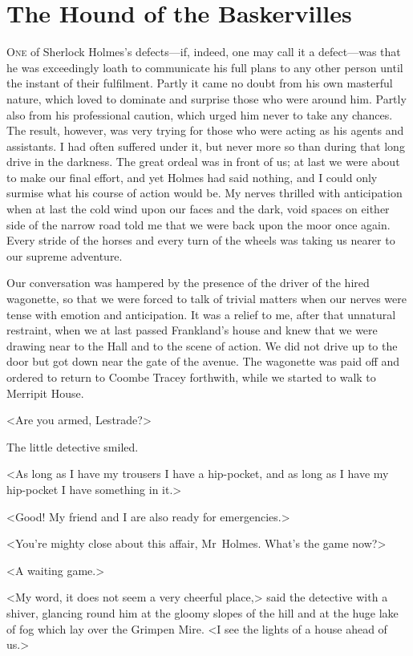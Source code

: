 \chapter{The Hound of the Baskervilles}
\lettrine{O}{ne} of Sherlock Holmes's defects—if, indeed, one may call it a defect—was that he was exceedingly loath to communicate his full plans to any other person until the instant of their fulfilment. Partly it came no doubt from his own masterful nature, which loved to dominate and surprise those who were around him. Partly also from his professional caution, which urged him never to take any chances. The result, however, was very trying for those who were acting as his agents and assistants. I had often suffered under it, but never more so than during that long drive in the darkness. The great ordeal was in front of us; at last we were about to make our final effort, and yet Holmes had said nothing, and I could only surmise what his course of action would be. My nerves thrilled with anticipation when at last the cold wind upon our faces and the dark, void spaces on either side of the narrow road told me that we were back upon the moor once again. Every stride of the horses and every turn of the wheels was taking us nearer to our supreme adventure.

Our conversation was hampered by the presence of the driver of the hired wagonette, so that we were forced to talk of trivial matters when our nerves were tense with emotion and anticipation. It was a relief to me, after that unnatural restraint, when we at last passed Frankland's house and knew that we were drawing near to the Hall and to the scene of action. We did not drive up to the door but got down near the gate of the avenue. The wagonette was paid off and ordered to return to Coombe Tracey forthwith, while we started to walk to Merripit House.

<Are you armed, Lestrade?>

The little detective smiled.

<As long as I have my trousers I have a hip-pocket, and as long as I have my hip-pocket I have something in it.>

<Good! My friend and I are also ready for emergencies.>

<You're mighty close about this affair, Mr~Holmes. What's the game now?>

<A waiting game.>

<My word, it does not seem a very cheerful place,> said the detective with a shiver, glancing round him at the gloomy slopes of the hill and at the huge lake of fog which lay over the Grimpen Mire. <I see the lights of a house ahead of us.>

